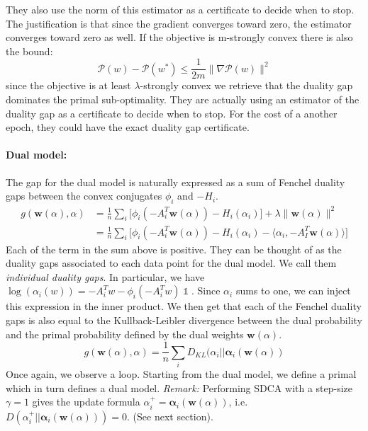 \documentclass{article}
\DeclareMathOperator{\1}{\mathbb{1}}
\begin{document}
They also use the norm of this estimator as a certificate to decide when to stop.
The justification is that since the gradient converges toward zero, the estimator converges toward zero as well.
If the objective is m-strongly convex there is also the bound:
\begin{equation*}
	\mathscr P (w) - \mathscr P(w^*) \leq \frac{1}{2 m}\|\nabla \mathscr P (w)\|^2
\end{equation*}
since the objective is at least $\lambda$-strongly convex we retrieve that the duality gap dominates the primal sub-optimality.
They are actually using an estimator of the duality gap as a certificate to decide when to stop.
For the cost of a another epoch, they could have the exact duality gap certificate.

\paragraph{Dual model:}
The gap for the dual model is naturally expressed as a sum of Fenchel duality gaps between the convex conjugates $\phi_i$ and $-H_i$. 
\begin{align*}
	g(\bm w(\alpha),\alpha) 
	& = \frac{1}{n} \sum_i \big [ \phi_i(-A_i^T \bm w(\alpha)) - H_i(\alpha_i) \big ] + \lambda \|\bm w(\alpha)\|^2 \\
	& =  \frac{1}{n} \sum_i \big [ \phi_i(-A_i^T \bm w(\alpha)) - H_i(\alpha_i) - \langle \alpha_i,  -A_I^T \bm w(\alpha) \rangle \big ]
\end{align*}
Each of the term in the sum above is positive.
They can be thought of as the duality gaps associated to each data point for the dual model.
We call them \textit{individual duality gaps}.
In particular, we have $\log(\alpha_i(w)) = -A_i^Tw - \phi_i(-A_i^Tw) \1$. Since $\alpha_i$ sums to one, we can inject this expression in the inner product. We then get that each of the Fenchel duality gaps is also equal to the Kullback-Leibler divergence between the dual probability and the primal probability defined by the dual weights $\bm w(\alpha)$.
\begin{equation}
	\label{dual duality gaps}
	g(\bm w(\alpha),\alpha) = \frac{1}{n} \sum_i D_{KL} (\alpha_i || \bm \alpha_i(\bm w(\alpha))
\end{equation}
Once again, we observe a loop. Starting from the dual model, we define a primal which in turn defines a dual model.
\textit{Remark:} Performing SDCA with a step-size $\gamma=1$ gives the update formula $\alpha_i^+ = \bm \alpha_i(\bm w(\alpha))$, i.e. $ D(\alpha_i^+ || \bm \alpha_i(\bm w(\alpha)) )=0$. (See next section).
\end{document}
